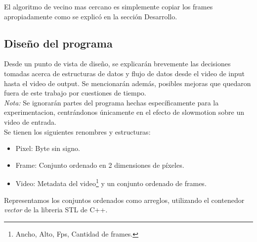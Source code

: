 El algoritmo de vecino mas cercano es simplemente copiar los frames apropiadamente como se explicó en la sección Desarrollo.

\subsection{Diseño del programa}
Desde un punto de vista de diseño, se explicarán brevemente las decisiones tomadas acerca de estructuras de datos y flujo de datos desde el video de input hasta el video de output. Se mencionarán además, posibles mejoras que quedaron fuera de este trabajo por cuestiones de tiempo.\\

\emph{Nota:} Se ignorarán partes del programa hechas específicamente para la experimentacion, centrándonos únicamente en el efecto de slowmotion sobre un video de entrada.\\

Se tienen los siguientes renombres y estructuras:
\begin{itemize}
	\item Pixel: Byte sin signo.
	\item Frame: Conjunto ordenado en 2 dimensiones de píxeles.
	\item Video: Metadata del video\footnote{Ancho, Alto, Fps, Cantidad de frames.} y un conjunto ordenado de frames.
\end{itemize}

Representamos los conjuntos ordenados como arreglos, utilizando el contenedor \emph{vector} de la libreria STL de C++.\\

